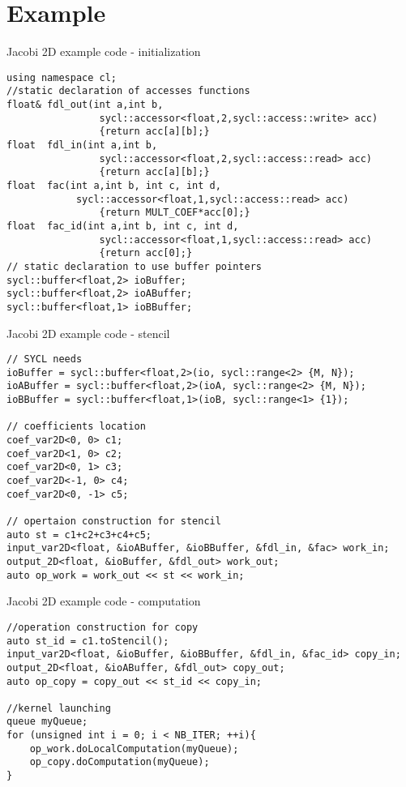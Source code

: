 \documentclass[10pt, compress]{beamer}
\begin{document}
\section{Example}


\begin{frame}[fragile]{Jacobi 2D example code - initialization}

\begin{verbatim}
using namespace cl;
//static declaration of accesses functions
float& fdl_out(int a,int b, 
                sycl::accessor<float,2,sycl::access::write> acc) 
                {return acc[a][b];}
float  fdl_in(int a,int b, 
                sycl::accessor<float,2,sycl::access::read> acc) 
                {return acc[a][b];}
float  fac(int a,int b, int c, int d, 
            sycl::accessor<float,1,sycl::access::read> acc) 
                {return MULT_COEF*acc[0];}
float  fac_id(int a,int b, int c, int d, 
                sycl::accessor<float,1,sycl::access::read> acc) 
                {return acc[0];}
// static declaration to use buffer pointers
sycl::buffer<float,2> ioBuffer;
sycl::buffer<float,2> ioABuffer;
sycl::buffer<float,1> ioBBuffer;
\end{verbatim}

\end{frame}

\begin{frame}[fragile]{Jacobi 2D example code - stencil}

\begin{verbatim}
// SYCL needs
ioBuffer = sycl::buffer<float,2>(io, sycl::range<2> {M, N});
ioABuffer = sycl::buffer<float,2>(ioA, sycl::range<2> {M, N}); 
ioBBuffer = sycl::buffer<float,1>(ioB, sycl::range<1> {1}); 

// coefficients location
coef_var2D<0, 0> c1;  
coef_var2D<1, 0> c2;
coef_var2D<0, 1> c3;
coef_var2D<-1, 0> c4;
coef_var2D<0, -1> c5;

// opertaion construction for stencil
auto st = c1+c2+c3+c4+c5;
input_var2D<float, &ioABuffer, &ioBBuffer, &fdl_in, &fac> work_in;
output_2D<float, &ioBuffer, &fdl_out> work_out;
auto op_work = work_out << st << work_in;
\end{verbatim}

\end{frame}

\begin{frame}[fragile]{Jacobi 2D example code - computation}

\begin{verbatim}
//operation construction for copy
auto st_id = c1.toStencil();
input_var2D<float, &ioBuffer, &ioBBuffer, &fdl_in, &fac_id> copy_in;
output_2D<float, &ioABuffer, &fdl_out> copy_out;
auto op_copy = copy_out << st_id << copy_in;

//kernel launching
queue myQueue;
for (unsigned int i = 0; i < NB_ITER; ++i){      
    op_work.doLocalComputation(myQueue);
    op_copy.doComputation(myQueue);
}
\end{verbatim}

\end{frame}
\end{document}
